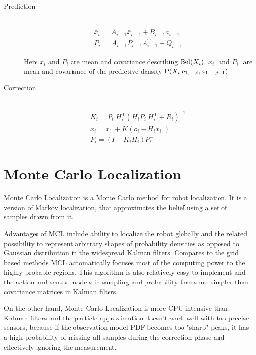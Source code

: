 \begin{description}
\item[Prediction] \hfill \\
\begin{gather}
	\bar{x}^{-}_i = A_{i - 1}\bar{x}_{i-1} + B_{i - 1}a_{i - 1}
	\\
	P^{-}_i = A_{i - 1}P_{i - 1}A^\mathrm{T}_{i - 1} + Q_{i - 1}
\end{gather}

Here \(\bar{x}_i\) and \(P_i\) are mean and covariance describing \(\Bel(X_i)\).
\(\bar{x}^{-}_i\) and \(P^{-}_i\) are mean and covariance of the predictive density
\(\P(X_i | o_{1, \dotsc, i}, a_{1, \dotsc, i - 1})\)

\item[Correction] \hfill \\
\begin{gather}
	\label{eq:kalman-gain}
	K_i = P^{-}_{i}H^\mathrm{T}_{i}(H_{i}P^{-}_{i}H^\mathrm{T}_{i} + R_{i})^{-1}
	\\
	\bar{x}_i = \bar{x}^{-}_i + K (o_i - H_{i}\bar{x}^{-}_i)
	\\
	P_i = (I - K_{i}H_{i})P^{-}_i
\end{gather}
\end{description}


\section{Monte Carlo Localization}
\label{sec:mcl-algorithm}


Monte Carlo Localization \cite{dellaert99} is a Monte Carlo method for
robot localization.
It is a version of Markov localization, that approximates the belief
using a set of samples drawn from it.

Advantages of MCL include ability to localize the robot globally and the related
possibility to represent arbitrary shapes of probability densities as opposed to
Gaussian distribution in the widespread Kalman filters.
Compares to the grid based methods MCL automatically focuses most of the
computing power to the highly probable regions.
This algorithm is also relatively easy to implement and the action and sensor models
in sampling and probability forms are simpler than covariance matrices in
Kalman filters.

On the other hand, Monte Carlo Localization is more CPU intensive than Kalman filters
and the particle approximation doesn't work well with too precise sensors,
because if the observation model PDF becomes too "sharp" peaks, it has a high probability
of missing all samples during the correction phase and effectively ignoring the measurement.

